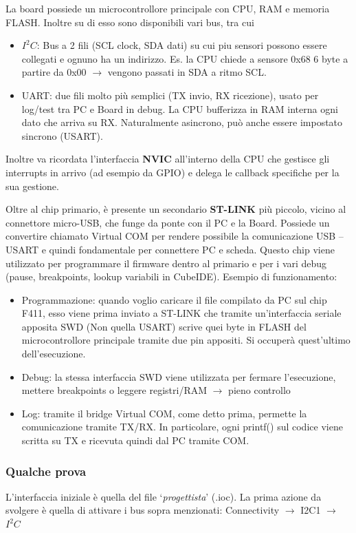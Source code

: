 La board possiede un microcontrollore principale con CPU, RAM e memoria FLASH. Inoltre su di esso sono disponibili vari bus, tra cui
\begin{itemize}
    \item $I^2C$: Bus a 2 fili (SCL clock, SDA dati) su cui piu sensori possono essere collegati e ognuno ha un indirizzo. Es. la CPU chiede a sensore 0x68 6 byte a partire da 0x00 $\rightarrow$ vengono passati in SDA a ritmo SCL.
    \item UART: due fili molto più semplici (TX invio, RX ricezione), usato per log/test tra PC e Board in debug. La CPU bufferizza in RAM interna ogni dato che arriva su RX. Naturalmente asincrono, può anche essere impostato sincrono (USART).
\end{itemize}
Inoltre va ricordata l’interfaccia \textbf{NVIC} all’interno della CPU che gestisce gli interrupts in arrivo (ad esempio da GPIO) e delega le callback specifiche per la sua gestione.

Oltre al chip primario, è presente un secondario \textbf{ST-LINK} più piccolo, vicino al connettore micro-USB, che funge da ponte con il PC e la Board. Possiede un convertire chiamato Virtual COM per rendere possibile la comunicazione USB – USART e quindi fondamentale per connettere PC e scheda. Questo chip viene utilizzato per programmare il firmware dentro al primario e per i vari debug (pause, breakpoints, lookup variabili in CubeIDE). Esempio di funzionamento:
\begin{itemize}
    \item Programmazione: quando voglio caricare il file compilato da PC sul chip F411, esso viene prima inviato a ST-LINK che tramite un’interfaccia seriale apposita SWD (Non quella USART) scrive quei byte in FLASH del microcontrollore principale tramite due pin appositi. Si occuperà quest’ultimo dell’esecuzione.
    \item Debug: la stessa interfaccia SWD viene utilizzata per fermare l’esecuzione, mettere breakpoints o leggere registri/RAM $\rightarrow$ pieno controllo
    \item Log: tramite il bridge Virtual COM, come detto prima, permette la comunicazione tramite TX/RX. In particolare, ogni printf() sul codice viene scritta su TX e ricevuta quindi dal PC tramite COM.
\end{itemize}

\subsubsection{Qualche prova}
L’interfaccia iniziale è quella del file ‘\textit{progettista}’ (.ioc). La prima azione da svolgere è quella di attivare i bus sopra menzionati: Connectivity $\rightarrow$ I2C1 $\rightarrow$ $I^2C$ 

